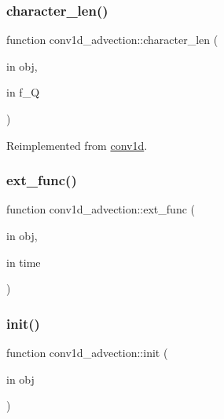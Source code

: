 \subsubsection{\texorpdfstring{character\+\_\+len()}{character\_len()}}
{\footnotesize\ttfamily function conv1d\+\_\+advection\+::character\+\_\+len (\begin{DoxyParamCaption}\item[{in}]{obj,  }\item[{in}]{f\+\_\+Q }\end{DoxyParamCaption})\hspace{0.3cm}{\ttfamily [virtual]}}



Reimplemented from \hyperlink{classconv1d_a8a2a102c6d68a467cefe7db537a971bc}{conv1d}.

\mbox{\label{classconv1d__advection_ab19c0cd2f986516631c572ef308397df}} 
\subsubsection{\texorpdfstring{ext\+\_\+func()}{ext\_func()}}
{\footnotesize\ttfamily function conv1d\+\_\+advection\+::ext\+\_\+func (\begin{DoxyParamCaption}\item[{in}]{obj,  }\item[{in}]{time }\end{DoxyParamCaption})}

\mbox{\label{classconv1d__advection_ae4bea3bfd914f26ee4b619209dead174}} 
\subsubsection{\texorpdfstring{init()}{init()}}
{\footnotesize\ttfamily function conv1d\+\_\+advection\+::init (\begin{DoxyParamCaption}\item[{in}]{obj }\end{DoxyParamCaption})}

\mbox{\label{classconv1d__advection_ab2cc0337e4e4fc71b8f01e8bb91f1992}} 
